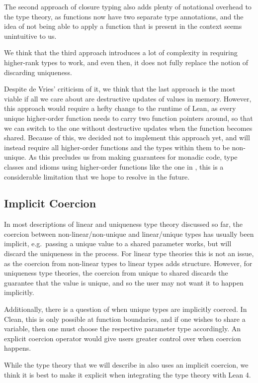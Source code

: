 The second approach of closure typing also adds plenty of notational overhead to the type theory, as functions now have two separate type annotations, and the idea of not being able to apply a function that is present in the context seems unintuitive to us.

We think that the third approach introduces a lot of complexity in requiring higher-rank types to work, and even then, it does not fully replace the notion of discarding uniqueness.

Despite de Vries' criticism of it, we think that the last approach is the most viable if all we care about are destructive updates of values in memory. However, this approach would require a hefty change to the runtime of Lean, as every unique higher-order function needs to carry two function pointers around, so that we can switch to the one without destructive updates when the function becomes shared. Because of this, we decided not to implement this approach yet, and will instead require all higher-order functions and the types within them to be non-unique. As this precludes us from making guarantees for monadic code, type classes and idioms using higher-order functions like the one in , this is a considerable limitation that we hope to resolve in the future.

\subsection{Implicit Coercion}\label{sec:coercions}
In most descriptions of linear and uniqueness type theory discussed so far, the coercion between non-linear/non-unique and linear/unique types has usually been implicit, e.g.\ passing a unique value to a shared parameter works, but will discard the uniqueness in the process. For linear type theories this is not an issue, as the coercion from non-linear types to linear types adds structure. However, for uniqueness type theories, the coercion from unique to shared discards the guarantee that the value is unique, and so the user may not want it to happen implicitly. 

Additionally, there is a question of when unique types are implicitly coerced. In Clean, this is only possible at function boundaries, and if one wishes to share a variable, then one must choose the respective parameter type accordingly. An explicit coercion operator would give users greater control over when coercion happens.

While the type theory that we will describe in  also uses an implicit coercion, we think it is best to make it explicit when integrating the type theory with Lean 4.

